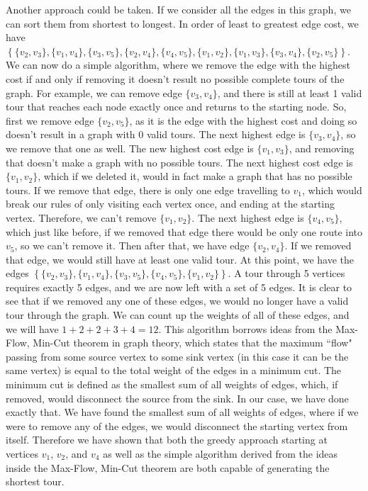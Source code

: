 \documentclass{article}
\renewcommand{\_}{\ifincsname_\else\legacyunderscore\fi}
\begin{document}
Another approach could be taken. If we consider all the edges in this graph, we can sort them from shortest to longest. In order of least to greatest edge cost, we have $\left\{\{v_2, v_3\}, \{v_1, v_4\}, \{v_3, v_5\}, \{v_2, v_4\}, \{v_4, v_5\}, \{v_1, v_2\}, \{v_1, v_3\}, \{v_3, v_4\}, \{v_2, v_5\}\right\}$. We can now do a simple algorithm, where we remove the edge with the highest cost if and only if removing it doesn't result no possible complete tours of the graph. For example, we can remove edge $\{v_3, v_4\}$, and there is still at least 1 valid tour that reaches each node exactly once and returns to the starting node. So, first we remove edge $\{v_2, v_5\}$, as it is the edge with the highest cost and doing so doesn't result in a graph with 0 valid tours. The next highest edge is $\{v_3, v_4\}$, so we remove that one as well. The new highest cost edge is $\{v_1, v_3\}$, and removing that doesn't make a graph with no possible tours. The next highest cost edge is $\{v_1, v_2\}$, which if we deleted it, would in fact make a graph that has no possible tours. If we remove that edge, there is only one edge travelling to $v_1$, which would break our rules of only visiting each vertex once, and ending at the starting vertex. Therefore, we can't remove $\{v_1, v_2\}$. The next highest edge is $\{v_4, v_5\}$, which just like before, if we removed that edge there would be only one route into $v_5$, so we can't remove it. Then after that, we have edge $\{v_2, v_4\}$. If we removed that edge, we would still have at least one valid tour. At this point, we have the edges $\left\{\{v_2, v_3\}, \{v_1, v_4\}, \{v_3, v_5\}, \{v_4, v_5\}, \{v_1, v_2\} \right\}$. A tour through 5 vertices requires exactly 5 edges, and we are now left with a set of 5 edges. It is clear to see that if we removed any one of these edges, we would no longer have a valid tour through the graph. We can count up the weights of all of these edges, and we will have $1 + 2 + 2 + 3 + 4 = 12$. This algorithm borrows ideas from the Max-Flow, Min-Cut theorem in graph theory, which states that the maximum ``flow" passing from some source vertex to some sink vertex (in this case it can be the same vertex) is equal to the total weight of the edges in a minimum cut. The minimum cut is defined as the smallest sum of all weights of edges, which, if removed, would disconnect the source from the sink. In our case, we have done exactly that. We have found the smallest sum of all weights of edges, where if we were to remove any of the edges, we would disconnect the starting vertex from itself. Therefore we have shown that both the greedy approach starting at vertices $v_1$, $v_2$, and $v_4$ as well as the simple algorithm derived from the ideas inside the Max-Flow, Min-Cut theorem are both capable of generating the shortest tour. \\\\
\end{document}
